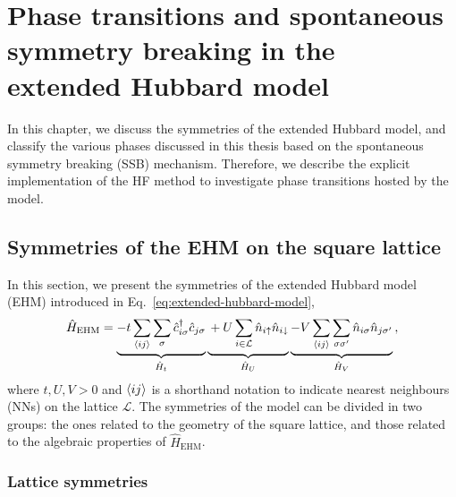  \def\GraphicsFolder{chapters/ehm-symmetries/pictures}
\chapter{Phase transitions and spontaneous symmetry breaking in the extended Hubbard model}\label{chap:ehm-symmetries}

In this chapter, we discuss the symmetries of the extended Hubbard model, and classify the various phases discussed in this thesis based on the spontaneous symmetry breaking (SSB) mechanism. Therefore, we describe the explicit implementation of the HF method to investigate phase transitions hosted by the model.

\section{Symmetries of the EHM on the square lattice}\label{sec:ehm-syms}

In this section, we present the symmetries of the extended Hubbard model (EHM) introduced in Eq.~\eqref{eq:extended-hubbard-model},
\[
	\hat H_\mathrm{EHM} =
	\underbrace{
		-t \sum_{\langle ij \rangle} \sum_\sigma \hat c_{i\sigma}^\dagger \hat c_{j\sigma}
	}_{\hat H_t}
	\underbrace{
		\vphantom{\sum_{\langle ij \rangle}}
		+ U \sum_{i\in\mathcal{L}} \hat n_{i\uparrow} \hat n_{i\downarrow}
	}_{\hat H_U}
	\underbrace{
		- V \sum_{\langle ij \rangle} \sum_{\sigma \sigma'} \hat n_{i\sigma} \hat n_{j\sigma'}
	}_{\hat H_V} \, ,
\]
where $t,U,V > 0$ and $\ev{ij}$ is a shorthand notation to indicate nearest neighbours (NNs) on the lattice $\mathcal{L}$. The symmetries of the model can be divided in two groups: the ones related to the geometry of the square lattice, and those related to the algebraic properties of $\hat H_\mathrm{EHM}$.

\subsection{Lattice symmetries}\label{subsec:lattice-syms}

